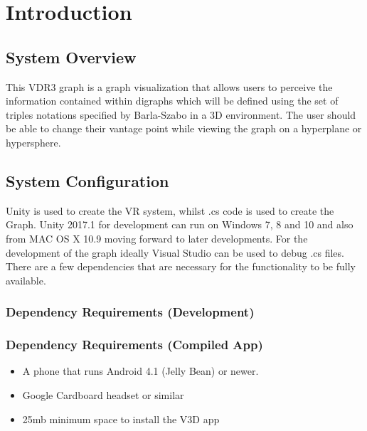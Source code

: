 \documentclass[english]{article}
\begin{document}

\tableofcontents
\newpage

\setcounter{page}{1}

\section{Introduction}
\subsection{System Overview}
This VDR3 graph is a graph visualization that allows users to perceive the information contained within digraphs which will be defined using the set of triples notations specified by Barla-Szabo in a 3D environment. The user should be able to change their vantage point while viewing the graph on a hyperplane or hypersphere.

\subsection{System Configuration}
Unity is used to create the VR system, whilst .cs code is used to create the Graph. Unity 2017.1 for development can run on Windows 7, 8 and 10 and also from MAC OS X 10.9 moving forward to later developments. For the development of the graph ideally Visual Studio can be used to debug .cs files. There are a few dependencies that are necessary for the functionality to be fully available.

\subsubsection{Dependency Requirements (Development)} 

\begin{itemsize}
	
\end{itemsize}

\subsubsection{Dependency Requirements (Compiled App)}

\begin{itemize}
   \item A phone that runs Android 4.1 (Jelly Bean) or newer.
    
   \item Google Cardboard headset or similar
    
   \item 25mb minimum space to install the V3D app 
\end{itemize} 
        
\end{document}
